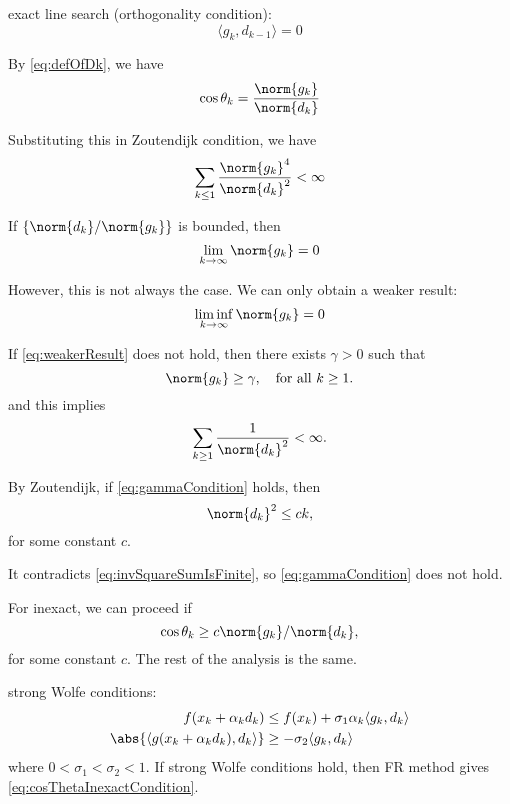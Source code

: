 \documentclass[\main/main]{subfiles}
\begin{document}
exact line search (orthogonality condition):
\begin{equation}
    \langle g_k, d_{k-1} \rangle = 0
\end{equation}

By \eqref{eq:defOfDk}, we have
\begin{equation}
    \cos \theta_k = \frac{\norm{g_k}}{\norm{d_k}}
\end{equation}

Substituting this in Zoutendijk condition, we have
\begin{equation}
    \sum_{k \leq 1} \frac{\norm{g_k}^4}{\norm{d_k}^2} < \infty
\end{equation}

If $\{ \norm{d_k} / \norm{g_k} \}$ is bounded, then
\begin{equation}
    \lim_{k \to \infty} \norm{g_k} = 0
\end{equation}

However, this is not always the case.
We can only obtain a weaker result:
\begin{equation}\label{eq:weakerResult}
    \liminf_{k \to \infty} \norm{g_k} = 0
\end{equation}

If \eqref{eq:weakerResult} does not hold, then there exists $\gamma > 0$ such that
\begin{equation}\label{eq:gammaCondition}
    \norm{g_k} \geq \gamma, \quad \text{for all } k \geq 1.
\end{equation}
and this implies
\begin{equation}\label{eq:invSquareSumIsFinite}
    \sum_{k \geq 1} \frac{1}{\norm{d_k}^2} < \infty.
\end{equation}

By Zoutendijk, if \eqref{eq:gammaCondition} holds, then
\begin{equation*}
    \norm{d_k}^2 \leq c k,
\end{equation*}
for some constant $c$.

It contradicts \eqref{eq:invSquareSumIsFinite}, so \eqref{eq:gammaCondition} does not hold.

For inexact, we can proceed if
\begin{equation}\label{eq:cosThetaInexactCondition}
    \cos \theta_k \geq c \norm{g_k} / \norm{d_k},
\end{equation}
for some constant $c$.
The rest of the analysis is the same.

strong Wolfe conditions:
\begin{align}
    f(x_k + \alpha_k d_k)                             & \leq f(x_k) + \sigma_1 \alpha_k \langle g_k, d_k \rangle \\
    \abs{ \langle g(x_k + \alpha_k d_k), d_k \rangle} & \geq -\sigma_2 \langle g_k, d_k \rangle
\end{align}
where $0 < \sigma_1 < \sigma_2 < 1$.
If strong Wolfe conditions hold, then FR method gives \eqref{eq:cosThetaInexactCondition}.
\end{document}
